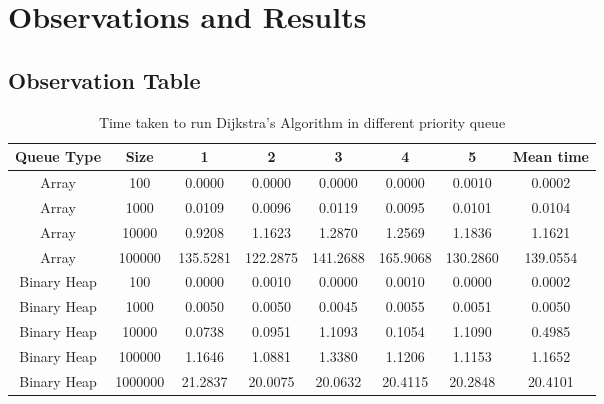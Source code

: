 \documentclass[12pt]{article}
\begin{document}
\section{Observations and Results}

\subsection{Observation Table}
\begin{table}[h]
    \centering
    \begin{tabular}{|c|c|c|c|c|c|c|c|}
    \hline
    Queue Type & Size & 1 & 2 & 3 & 4 & 5 & Mean time\\
    \hline
    Array       & 100       & 0.0000    & 0.0000    & 0.0000    & 0.0000    & 0.0010    & 0.0002\\
    Array       & 1000      & 0.0109    & 0.0096    & 0.0119    & 0.0095    & 0.0101    & 0.0104\\
    Array       & 10000     & 0.9208    & 1.1623    & 1.2870    & 1.2569    & 1.1836    & 1.1621\\
    Array       & 100000    & 135.5281  & 122.2875  & 141.2688  & 165.9068  & 130.2860  & 139.0554\\ 
    \hline
    Binary Heap       & 100       & 0.0000    & 0.0010    & 0.0000    & 0.0010    & 0.0000   & 0.0002\\
    Binary Heap       & 1000      & 0.0050    & 0.0050    & 0.0045    & 0.0055    & 0.0051   & 0.0050\\
    Binary Heap       & 10000     & 0.0738    & 0.0951    & 1.1093    & 0.1054    & 1.1090   & 0.4985\\
    Binary Heap       & 100000    & 1.1646    & 1.0881    & 1.3380    & 1.1206    & 1.1153   & 1.1652\\ 
    Binary Heap       & 1000000   & 21.2837   & 20.0075   & 20.0632   & 20.4115   & 20.2848  & 20.4101\\ 
    \hline
    \end{tabular}
\caption{Time taken to run Dijkstra’s Algorithm in different priority queue}
\label{tab:arraycoltable}
\end{table}
\end{document}
